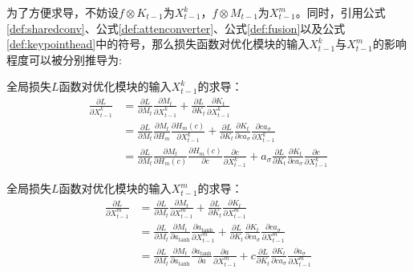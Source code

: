 为了方便求导，不妨设$f \otimes K_{t-1}$为$X^k_{t-1}$，$f \otimes M_{t-1}$为$X^m_{t-1}$。同时，引用公式\eqref{def:sharedconv}、公式\eqref{def:attenconverter}、公式\eqref{def:fusion}以及公式\eqref{def:keypointhead}中的符号，那么损失函数对优化模块的输入$X^k_{t-1}$与$X^m_{t-1}$的影响程度可以被分别推导为:
\begin{corollary}
\label{corollary:loss2xk}
全局损失$L$函数对优化模块的输入$X^k_{t-1}$的求导：
\begin{equation*}
\begin{aligned}
\frac{\partial L}{\partial X_{t-1}^k} &= \frac{\partial L}{\partial M_t}\frac{\partial M_t}{\partial X_{t-1}^k} + \frac{\partial L}{\partial K_t}\frac{\partial K_t}{\partial X_{t-1}^k}\\
&= \frac{\partial L}{\partial M_t}\frac{\partial M_t}{\partial H_m}\frac{\partial H_m(c)}{\partial X_{t-1}^k} + \frac{\partial L}{\partial K_t}\frac{\partial K_t}{\partial ca_{\sigma}}\frac{\partial ca_{\sigma}}{\partial X_{t-1}^k}\\
&= \frac{\partial L}{\partial M_t}\frac{\partial M_t}{\partial H_m(c)}\frac{\partial H_m(c)}{\partial c}\frac{\partial c}{\partial X_{t-1}^k} + a_{\sigma}\frac{\partial L}{\partial K_t}\frac{\partial K_t}{\partial ca_{\sigma}}\frac{\partial c}{\partial X_{t-1}^k}
\end{aligned}
\end{equation*}
\end{corollary}
\begin{corollary}
\label{corollary:loss2xm}
全局损失$L$函数对优化模块的输入$X^m_{t-1}$的求导：
\begin{equation*}
\begin{aligned}
\frac{\partial L}{\partial X^m_{t-1}} &= \frac{\partial L}{\partial M_t}\frac{\partial M_t}{\partial X^m_{t-1}} + \frac{\partial L}{\partial K_t}\frac{\partial K_t}{\partial X^m_{t-1}}\\
&=\frac{\partial L}{\partial M_t}\frac{\partial M_t}{\partial a_{\tanh}}\frac{\partial a_{\tanh}}{\partial X^m_{t-1}} + \frac{\partial L}{\partial K_t}\frac{\partial K_t}{\partial ca_{\sigma}}\frac{\partial ca_{\sigma}}{\partial X^m_{t-1}}\\
&=\frac{\partial L}{\partial M_t}\frac{\partial M_t}{\partial a_{\tanh}}\frac{\partial a_{\tanh}}{\partial a}\frac{\partial a}{\partial X^m_{t-1}} + c\frac{\partial L}{\partial K_t}\frac{\partial K_t}{\partial ca_{\sigma}}\frac{\partial a_{\sigma}}{\partial X^m_{t-1}}
\end{aligned}
\end{equation*}
\end{corollary}

